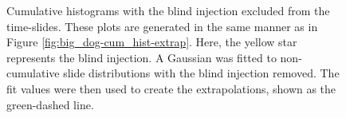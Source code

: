 \begin{figure}[p]
\center
{}
\label{fig:big_dog-cum_hist_no_littles-extrap}
\caption{Cumulative histograms with the blind injection excluded from the time-slides. These plots are generated in the same manner as in Figure \ref{fig:big_dog-cum_hist-extrap}. Here, the yellow star represents the blind injection. A Gaussian was fitted to non-cumulative slide distributions with the blind injection removed. The fit values were then used to create the extrapolations, shown as the green-dashed line.}
\end{figure}

